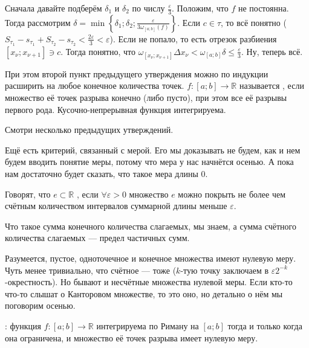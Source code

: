 \documentclass{article}
\begin{document}
\begin{itemize}
\begin{Proof}
\begin{enumerate}
                Сначала давайте подберём $\delta_1$ и $\delta_2$ по числу $\frac\varepsilon3$. Положим, что $f$ не постоянна. Тогда рассмотрим $\delta=\min\left\{\delta_1;\delta_2;\frac\varepsilon{3\omega_{[a;b]}(f)}\right\}$. Если $c\in\tau$, то всё понятно ($S_{\tau_1}-s_{\tau_1}+S_{\tau_2}-s_{\tau_2}<\frac{2\varepsilon}3<\varepsilon$). Если не попало, то есть отрезок разбиения $[x_\nu;x_{\nu+1}]\ni c$. Тогда понятно, что $\omega_{[x_\nu;x_{\nu+1}]}\Delta x_\nu<\omega_{[a;b]}\delta\leqslant\frac\varepsilon3$. Ну, теперь всё.
            \end{enumerate}
        \end{Proof}
        \thm При этом второй пункт предыдущего утверждения можно по индукции расширить на любое конечное количества точек.
        \dfn $f\colon[a;b]\to\mathbb R$ называется , если множество её точек разрыва конечно (либо пусто), при этом все её разрывы первого рода.
        \thm Кусочно-непрерывная функция интегрируема.
        \begin{Proof}
            Смотри несколько предыдущих утверждений.
        \end{Proof}
        \begin{Comment}
            Ещё есть критерий, связанный с мерой. Его мы доказывать не будем, как и нем будем вводить понятие меры, потому что мера у нас начнётся осенью. А пока нам достаточно будет сказать, что такое мера длины 0.
        \end{Comment}
        \dfn Говорят, что $e\subset\mathbb R$ , если $\forall\varepsilon>0$ множество $e$ можно покрыть не более чем счётным количеством интервалов суммарной длины меньше $\varepsilon$.
        \begin{Comment}
            Что такое сумма конечного количества слагаемых, мы знаем, а сумма счётного количества слагаемых --- предел частичных сумм.
        \end{Comment}
        \begin{Example}
            Разумеется, пустое, одноточечное и конечное множества имеют нулевую меру. Чуть менее тривиально, что счётное --- тоже ($k$-тую точку заключаем в $\varepsilon2^{-k}$-окрестность). Но бывают и несчётные множества нулевой меры. Если кто-то что-то слышат о Канторовом множестве, то это оно, но детально о нём мы поговорим осенью.
        \end{Example}
        \thm {}: функция $f\colon[a;b]\to\mathbb R$ интегрируема по Риману на $[a;b]$ тогда и только когда она ограничена, и множество её точек разрыва имеет нулевую меру.

\end{itemize}
\end{document}
